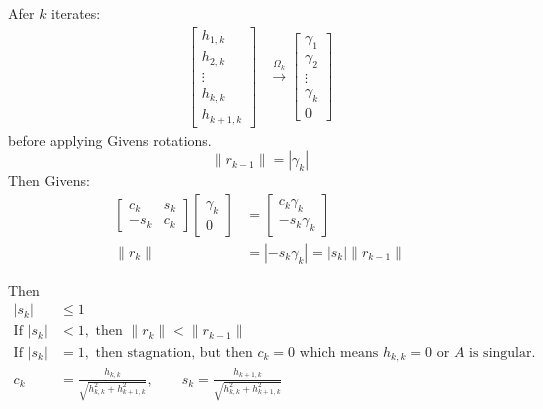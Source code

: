 Afer $k$ iterates:
\begin{align*}
    \begin{bmatrix}
        h_{1,k} \\
        h_{2,k} \\
        \vdots  \\
        h_{k,k} \\
        h_{k+1,k}
    \end{bmatrix}
     & \xrightarrow{\Omega_k}
    \begin{bmatrix}
        \gamma_1 \\
        \gamma_2 \\
        \vdots   \\
        \gamma_k \\
        0
    \end{bmatrix}
\end{align*}
before applying Givens rotations.
\[
    \|r_{k-1}\| = |\gamma_k|
\]
Then Givens:
\begin{align*}
    \begin{bmatrix}
        c_k  & s_k \\
        -s_k & c_k
    \end{bmatrix}
    \begin{bmatrix}
        \gamma_k \\
        0
    \end{bmatrix}
            & =
    \begin{bmatrix}
        c_k \gamma_k \\
        -s_k \gamma_k
    \end{bmatrix}                                  \\
    \|r_k\| & = |-s_k \gamma_k| = |s_k| \|r_{k-1}\|
\end{align*}

Then
\begin{align*}
    |s_k|            & \leq 1                                                                                                               \\
    \text{If } |s_k| & < 1, \text{ then } \|r_k\| < \|r_{k-1}\|                                                                             \\
    \text{If } |s_k| & = 1, \text{ then stagnation, but then } c_k = 0 \text{ which means } h_{k, k} = 0 \text{ or } A \text{ is singular.} \\
    c_k              & = \frac{h_{k,k}}{\sqrt{h_{k,k}^2 + h_{k+1,k}^2}}, \qquad s_k = \frac{h_{k+1,k}}{\sqrt{h_{k,k}^2 + h_{k+1,k}^2}}
\end{align*}

